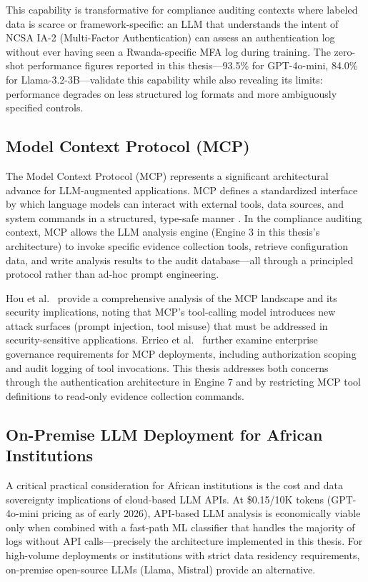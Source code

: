 \documentclass[12pt,oneside]{report}
\begin{document}
This capability is transformative for compliance auditing contexts where labeled data is scarce or framework-specific: an LLM that understands the intent of NCSA IA-2 (Multi-Factor Authentication) can assess an authentication log without ever having seen a Rwanda-specific MFA log during training. The zero-shot performance figures reported in this thesis—93.5\% for GPT-4o-mini, 84.0\% for Llama-3.2-3B—validate this capability while also revealing its limits: performance degrades on less structured log formats and more ambiguously specified controls.

\subsection{Model Context Protocol (MCP)}

The Model Context Protocol (MCP) \cite{mcp_anthropic, mcp_spec} represents a significant architectural advance for LLM-augmented applications. MCP defines a standardized interface by which language models can interact with external tools, data sources, and system commands in a structured, type-safe manner \cite{mcp_spec}. In the compliance auditing context, MCP allows the LLM analysis engine (Engine 3 in this thesis's architecture) to invoke specific evidence collection tools, retrieve configuration data, and write analysis results to the audit database—all through a principled protocol rather than ad-hoc prompt engineering.

Hou et al.\ \cite{mcp_landscape} provide a comprehensive analysis of the MCP landscape and its security implications, noting that MCP's tool-calling model introduces new attack surfaces (prompt injection, tool misuse) that must be addressed in security-sensitive applications. Errico et al.\ \cite{mcp_enterprise} further examine enterprise governance requirements for MCP deployments, including authorization scoping and audit logging of tool invocations. This thesis addresses both concerns through the authentication architecture in Engine 7 and by restricting MCP tool definitions to read-only evidence collection commands.

\subsection{On-Premise LLM Deployment for African Institutions}

A critical practical consideration for African institutions is the cost and data sovereignty implications of cloud-based LLM APIs. At \$0.15/10K tokens (GPT-4o-mini pricing as of early 2026), API-based LLM analysis is economically viable only when combined with a fast-path ML classifier that handles the majority of logs without API calls—precisely the architecture implemented in this thesis. For high-volume deployments or institutions with strict data residency requirements, on-premise open-source LLMs (Llama, Mistral) provide an alternative.
\end{document}
